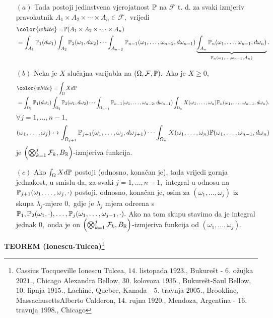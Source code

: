\documentclass{article}
\begin{document}
\begin{enumerate}
    \item[\((a)\)] Tada postoji jedinstvena vjerojatnost \(\Bbb P\) na \(\mathcal F\) t. d. za svaki izmjeriv pravokutnik \(A_1\times A_2\times\cdots\times A_n\in\mathcal F,\) vrijedi \[\begin{aligned}{}&{\color{white}=}\Bbb P(A_1\times A_2\times\cdots\times A_n)\\&=\int_{A_1}\Bbb P_1(d\omega_1)\int_{A_2}\Bbb P_2(\omega_1,d\omega_2)\cdots\int_{A_{n-2}}\Bbb P_{n-1}(\omega_1,\ldots,\omega_{n-2},d\omega_{n-1})\underbrace{\int_{A_n}\Bbb P_n(\omega_1,\ldots,\omega_{n-1},d\omega_n)}_{\Bbb P_n(\omega_1,\ldots,\omega_{n-1},A_n)}.\end{aligned}\] 
    \item[\((b)\)] Neka je \(X\) slučajna varijabla na \((\Omega,\mathcal F,\Bbb P).\) Ako je \(X\ge0,\) \[\begin{aligned}{}&{\color{white}=}\int_\Omega Xd\Bbb P\\&=\int_{\Omega_1}\Bbb P_1(d\omega_1)\int_{\Omega_2}\Bbb P_2(\omega_1,d\omega_2)\cdots\int_{\Omega_{n-1}}\Bbb P_{n-1}(\omega_1,\ldots,\omega_{n-2},d\omega_{n-1})\int_{\Omega_n}X(\omega_1,\ldots,\omega_n)\Bbb P_n(\omega_1,\ldots,\omega_{n-1},d\omega_n).\end{aligned}\] \(\forall j=1,\ldots,{n-1},\) \[(\omega_1,\ldots,\omega_j)\mapsto\int_{\Omega_{j+1}}\Bbb P_{j+1}(\omega_1,\ldots,\omega_j,d\omega_{j+1})\cdots\int_{\Omega_n}X(\omega_1,\ldots,\omega_n)\Bbb P(\omega_1,\ldots,\omega_{n-1},d\omega_n)\] je \(\left(\bigotimes_{k=1}^j\mathcal F_k,B_\Bbb R\right)\)-izmjeriva funkcija.
    \item[\((c)\)] Ako \(\int_\Omega Xd\Bbb P\) postoji (odnosno, konačan je), tada vrijedi gornja jednakost, u smislu da, za svaki \(j=1,\ldots,n-1,\) integral u odnosu na \(\Bbb P_{j+1}(\omega_1,\ldots,\omega_j,\cdot)\) postoji, odnosno, konačan je, osim za \((\omega_1,\ldots,\omega_j)\) iz skupa \(\lambda_j\)-mjere \(0,\) gdje je \(\lambda_j\) mjera odre\dj{}ena s \(\Bbb P_1,\Bbb P_2(\omega_1,\cdot),\ldots,\Bbb P_j(\omega_1,\ldots,\omega_{j-1},\cdot).\) Ako na tom skupu stavimo da je integral jednak \(0,\) onda je on \(\left(\bigotimes_{k=1}^j\mathcal F_k, B_\Bbb R\right)\)-izmjeriva funkcija od \((\omega_1,\ldots,\omega_j).\) 
\end{enumerate}
\textbf{TEOREM (Ionescu-Tulcea)}\footnote[56]{Cassius Tocqueville Ionescu Tulcea, \(14.\) listopada \(1923.\), Bukurešt - \(6.\) ožujka \(2021.\), Chicago \newline Alexandra Bellow, \(30.\) kolovoza \(1935.\), Bukurešt-\newline Saul Bellow, \(10.\) lipnja \(1915.\), Lachine, Quebec, Kanada - \(5.\) travnja \(2005.\), Brookline, Massachusetts\newline Alberto Calderon, \(14.\) rujna \(1920.\), Mendoza, Argentina - \(16.\) travnja \(1998.\), Chicago}\newline 
\end{document}
